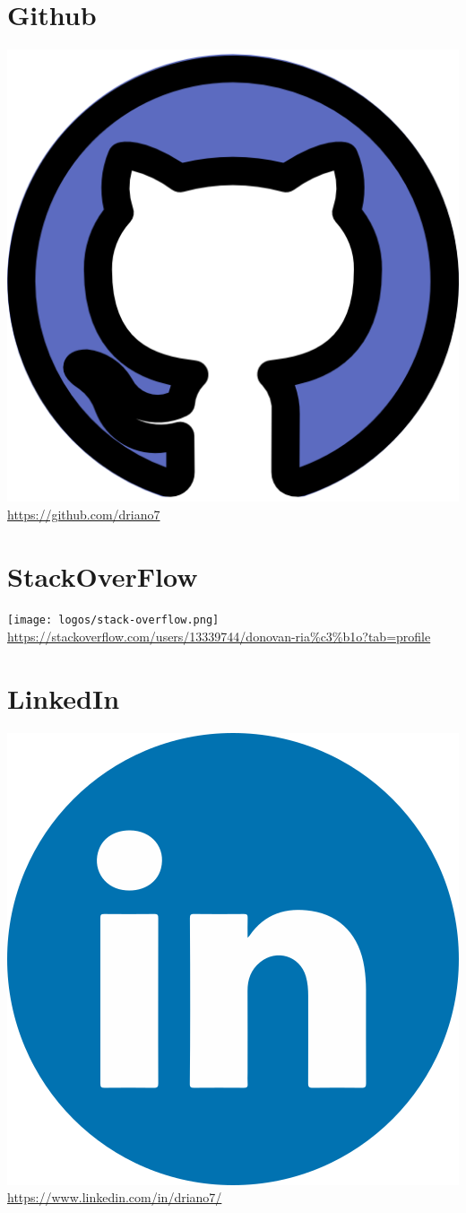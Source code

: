 \documentclass[]{friggeri-cv}
\begin{document}
\begin{aside}
    \section{Github}\includegraphics[scale=0.028]{logos/github.png}
    \url{https://github.com/driano7}
    ~
    \section{StackOverFlow}\texttt{[image: logos/stack-overflow.png]}
    \url{https://stackoverflow.com/users/13339744/donovan-ria\%c3\%b1o?tab=profile}
    ~
    \section{LinkedIn}\includegraphics[scale=0.028]{logos/linkedIN.png}
    \url{https://www.linkedin.com/in/driano7/}
    ~

\end{aside}
\end{document}
